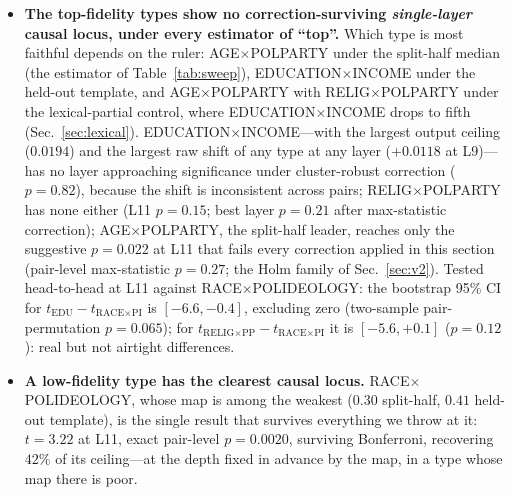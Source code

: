 \begin{itemize}
  \item \textbf{The top-fidelity types show no correction-surviving
        \emph{single-layer} causal locus, under every estimator of
        ``top''.} Which type is most faithful
        depends on the ruler: AGE$\times$POLPARTY under the split-half
        median (the estimator of Table~\ref{tab:sweep}),
        EDUCATION$\times$INCOME under the held-out template, and
        AGE$\times$POLPARTY with RELIG$\times$POLPARTY under the
        lexical-partial control, where EDUCATION$\times$INCOME drops to
        fifth (Sec.~\ref{sec:lexical}).
        EDUCATION$\times$INCOME---with the largest output ceiling
        ($0.0194$) and the largest raw shift of any type at any layer
        ($+0.0118$ at L9)---has no layer approaching significance under
        cluster-robust correction ($p=0.82$), because the shift is
        inconsistent across pairs; RELIG$\times$POLPARTY has none either
        (L11 $p=0.15$; best layer $p=0.21$ after max-statistic
        correction); AGE$\times$POLPARTY, the split-half leader,
        reaches only the suggestive $p=0.022$ at L11 that fails every
        correction applied in this section (pair-level max-statistic
        $p=0.27$; the Holm family of Sec.~\ref{sec:v2}). Tested
        head-to-head at L11 against
        RACE$\times$POLIDEOLOGY: the bootstrap 95\% CI for
        $t_{\text{EDU}} - t_{\text{RACE$\times$PI}}$ is
        $[-6.6, -0.4]$, excluding zero (two-sample pair-permutation
        $p=0.065$); for
        $t_{\text{RELIG$\times$PP}} - t_{\text{RACE$\times$PI}}$
        it is $[-5.6, +0.1]$ ($p=0.12$): real but not airtight
        differences.
  \item \textbf{A low-fidelity type has the clearest causal locus.}
        RACE$\times$POLIDEOLOGY, whose map is among the weakest
        ($0.30$ split-half, $0.41$ held-out template), is the single
        result that survives everything we throw at it: $t=3.22$ at L11,
        exact pair-level $p=0.0020$, surviving Bonferroni, recovering
        $42\%$ of its ceiling---at the depth fixed in advance by the map,
        in a type whose map there is poor.
\end{itemize}

